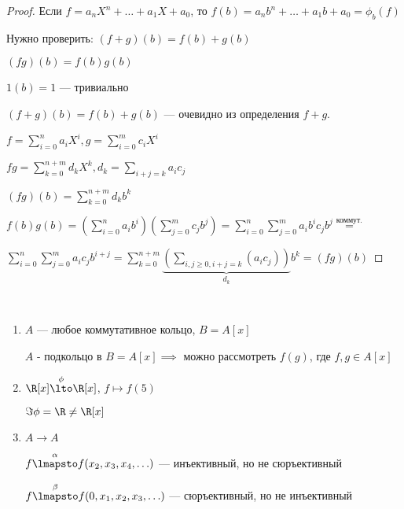 \begin{proof}

    Если $f = a_n X^n + \ldots + a_1 X + a_0$, то $f(b) = a_n b^n + \ldots + a_1 b + a_0 = \phi_b(f)$

    Нужно проверить: $(f + g)(b) = f(b) + g(b)$

    $(fg)(b) = f(b)g(b)$

    $1(b) = 1$ --- тривиально

    $(f + g)(b) = f(b) + g(b)$ --- очевидно из определения $f + g$.

    $f = \sum\limits_{i = 0}^n a_i X^i, g = \sum\limits_{i = 0}^m c_i X^i$

    $fg = \sum\limits_{k = 0}^{n + m} d_k X^k, d_k = \sum\limits_{i + j = k} a_i c_j$

    $(fg)(b) = \sum\limits_{k=0}^{n + m} d_k b^k$

    $f(b) g(b) = \left( \sum\limits_{i = 0}^n a_i b^i \right) \left( \sum\limits_{j = 0}^m c_j b^j \right) = \sum\limits_{i = 0}^n \sum\limits_{j = 0}^m a_i b^i c_j b^j \overset{\text{коммут.}}{=}$ 
    
    $\sum\limits_{i = 0}^n \sum\limits_{j = 0}^m a_i c_j b^{i + j} = \sum\limits_{k = 0}^{n + m} \underbrace{\left( \sum\limits_{i, j \geq 0, i + j = k} (a_i c_j) \right)}_{d_k} b^k = (fg)(b)$
\end{proof}

\begin{examples}~

    \begin{enumerate}
        \item 
        $A$ --- любое коммутативное кольцо, $B = A[x]$
        
        $A$ - подкольцо в $B = A[x] \implies$ можно рассмотреть $f(g)$, где $f, g \in A[x]$

        \item $\R[x] \overset{\phi}{\lto} \R[x]$, $f \mapsto f(5)$
        
        $\Im \phi = \R \neq \R[x]$

        \item $A \to A$
        
        $f \overset{\alpha}{\lmapsto} f(x_2, x_3, x_4, \ldots)$ --- инъективный, но не сюръективный 

        $f \overset{\beta}{\lmapsto} f(0, x_1, x_2, x_3, \ldots)$ --- сюръективный, но не инъективный
    \end{enumerate}

\end{examples}

